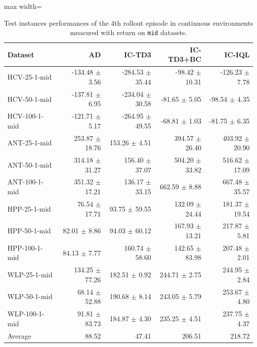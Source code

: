 \documentclass{article}
\begin{document}
\begin{table}[ht]
    \label{tab:}
    \begin{center}
    \caption{Test instances performances of the 4th rollout episode in continuous environments measured with return on \texttt{mid} datasets.}
    \begin{small}
    \begin{adjustbox}{max width=\columnwidth}
		\begin{tabular}{l|rrrr}
		\toprule
	\textbf{Dataset} & \textbf{AD} & \textbf{IC-TD3} & \textbf{IC-TD3+BC} & \textbf{IC-IQL}\\
\midrule
HCV-25-1-mid & -134.48 $\pm$ 3.56 & -284.53 $\pm$ 35.44 & -98.42 $\pm$ 10.31 & -126.23 $\pm$ 7.78\\
HCV-50-1-mid & -137.81 $\pm$ 6.95 & -234.04 $\pm$ 30.58 & -81.65 $\pm$ 5.05 & -98.54 $\pm$ 4.35\\
HCV-100-1-mid & -121.71 $\pm$ 5.17 & -264.95 $\pm$ 49.55 & -68.81 $\pm$ 1.03 & -81.75 $\pm$ 6.35\\
ANT-25-1-mid & 253.87 $\pm$ 18.76 & 153.26 $\pm$ 4.51 & 394.57 $\pm$ 26.40 & 403.92 $\pm$ 20.90\\
ANT-50-1-mid & 314.18 $\pm$ 31.27 & 156.40 $\pm$ 37.07 & 504.20 $\pm$ 33.82 & 516.62 $\pm$ 17.09\\
ANT-100-1-mid & 351.32 $\pm$ 17.21 & 136.17 $\pm$ 33.15 & 662.59 $\pm$ 8.88 & 667.48 $\pm$ 35.57\\
HPP-25-1-mid & 76.54 $\pm$ 17.71 & 93.75 $\pm$ 59.55 & 132.09 $\pm$ 24.44 & 181.37 $\pm$ 19.54\\
HPP-50-1-mid & 82.01 $\pm$ 8.86 & 94.03 $\pm$ 60.12 & 167.93 $\pm$ 13.21 & 217.87 $\pm$ 5.81\\
HPP-100-1-mid & 84.13 $\pm$ 7.77 & 160.74 $\pm$ 58.60 & 142.65 $\pm$ 83.98 & 207.48 $\pm$ 2.01\\
WLP-25-1-mid & 134.25 $\pm$ 77.26 & 182.51 $\pm$ 0.92 & 244.71 $\pm$ 2.75 & 244.95 $\pm$ 2.84\\
WLP-50-1-mid & 68.14 $\pm$ 52.88 & 190.68 $\pm$ 8.14 & 243.05 $\pm$ 5.79 & 253.67 $\pm$ 4.80\\
WLP-100-1-mid & 91.81 $\pm$ 83.73 & 184.87 $\pm$ 4.30 & 235.25 $\pm$ 4.51 & 237.75 $\pm$ 4.37\\
\midrule
Average & 88.52 & 47.41 & 206.51 & 218.72\\
\end{tabular}
        \end{adjustbox}
    \end{small}
    \end{center}
    \vskip -0.1in
\end{table}
\end{document}

